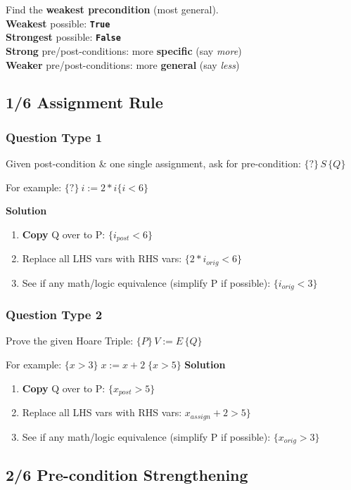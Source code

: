 Find the \textbf{weakest precondition} (most general).\\
\textbf{Weakest} possible: \textbf{\texttt{True}} \\
\textbf{Strongest} possible: \textbf{\texttt{False}} \\
\textbf{Strong} pre/post-conditions: more \textbf{specific} (say \emph{more}) \\
\textbf{Weaker} pre/post-conditions: more \textbf{general} (say \emph{less})

\subsection*{1/6 Assignment Rule}
\subsubsection*{Question Type 1}
Given post-condition \& one single assignment, ask for pre-condition:
\(\{?\}\,S\,\{Q\}\)

For example: \(\{?\}\ i := 2 * i \{i < 6\}\)

\textbf{Solution}
\begin{enumerate}
\item \textbf{Copy} Q over to P: \(\{i_{post} < 6\}\)
\item Replace all LHS vars with RHS vars: \(\{2 * i_{orig} < 6\}\)
\item See if any math/logic equivalence (simplify P if possible): \(\{i_{orig} < 3\}\)
\end{enumerate}

\subsubsection*{Question Type 2}
Prove the given Hoare Triple: \(\{P\}\,V := E\,\{Q\}\)

For example: \(\{x > 3\}\;x:=x+2\;\{x>5\}\)
\textbf{Solution}
\begin{enumerate}
\item \textbf{Copy} Q over to P: \(\{x_{post} > 5\}\)
\item Replace all LHS vars with RHS vars: \(x_{assign}+2 > 5\}\)
\item See if any math/logic equivalence (simplify P if possible): \(\{x_{orig} > 3\}\)
\end{enumerate}



\subsection*{2/6 Pre-condition Strengthening}

